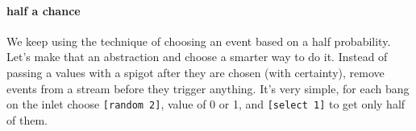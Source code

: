 \paragraph{half a chance}
We keep using the technique of choosing an event based on
a half probability. Let's make that an abstraction and choose
a smarter way to do it. Instead of passing a values with
a spigot after they are chosen (with certainty), remove events
from a stream before they trigger anything. It's very
simple, for each bang on the inlet choose \verb+[random 2]+, value of 
0 or 1, and \verb+[select 1]+ to get only half of them.